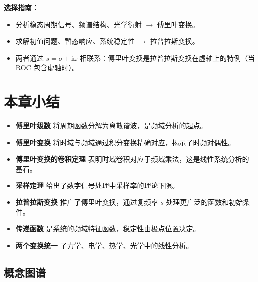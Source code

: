 \textbf{选择指南：}
\begin{itemize}
\item 分析稳态周期信号、频谱结构、光学衍射 $\to$ 傅里叶变换。
\item 求解初值问题、暂态响应、系统稳定性 $\to$ 拉普拉斯变换。
\item 两者通过 $s = \sigma + \mathrm{i}\omega$ 相联系：傅里叶变换是拉普拉斯变换在虚轴上的特例（当 ROC 包含虚轴时）。
\end{itemize}

\section{本章小结}

\begin{itemize}
\item \textbf{傅里叶级数} 将周期函数分解为离散谐波，是频域分析的起点。
\item \textbf{傅里叶变换} 将时域与频域通过积分变换精确对应，揭示了时频对偶性。
\item \textbf{傅里叶变换的卷积定理} 表明时域卷积对应于频域乘法，这是线性系统分析的基石。
\item \textbf{采样定理} 给出了数字信号处理中采样率的理论下限。
\item \textbf{拉普拉斯变换} 推广了傅里叶变换，通过复频率 $s$ 处理更广泛的函数和初始条件。
\item \textbf{传递函数} 是系统的频域特征函数，稳定性由极点位置决定。
\item \textbf{两个变换统一} 了力学、电学、热学、光学中的线性分析。
\end{itemize}

\subsection*{概念图谱}

\begin{center}
\end{center}

